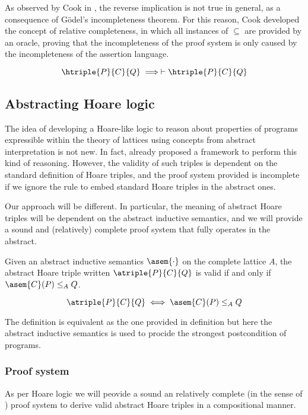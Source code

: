 As observed by Cook in \cite{Cook78}, the reverse implication is not true in 
general, as a consequence of Gödel's incompleteness theorem. For this reason, 
Cook developed the concept of relative completeness, in which all instances of 
$\subseteq$ are provided by an oracle, proving that the incompleteness of the 
proof system is only caused by the incompleteness of the assertion language.

\begin{theorem}
  $$\htriple{P}{C}{Q} \implies \vdash \htriple{P}{C}{Q}$$
\end{theorem}

\subsection{Abstracting Hoare logic}
The idea of developing a Hoare-like logic to reason about properties of 
programs expressible within the theory of lattices using concepts from abstract 
interpretation is not new. In fact, \cite{Cousot12} already proposed a framework 
to perform this kind of reasoning. However, the validity of such triples is 
dependent on the standard definition of Hoare triples, and the proof system 
provided is incomplete if we ignore the rule to embed standard Hoare triples 
in the abstract ones.

Our approach will be different. In particular, the meaning of abstract Hoare 
triples will be dependent on the abstract inductive semantics, and we will 
provide a sound and (relatively) complete proof system that fully operates in 
the abstract.

\begin{definition}
  \label{def:aht}
  Given an abstract inductive semantics $\asem{\cdot}$ on the complete lattice
  $A$, the abstract Hoare triple written $\atriple{P}{C}{Q}$ is valid if
  and only if $\asem{C}(P) \leq_A Q$.

  $$\atriple{P}{C}{Q} \iff \asem{C}(P) \leq_A Q$$
\end{definition}

The definition is equivalent as the one provided in definition \cite{def:hoare} 
but here the abstract inductive semantics is used to procide the strongest 
postcondition of programs.

\subsubsection{Proof system}
As per Hoare logic we will peovide a sound an relatively complete (in the sense
of \cite{Cook78}) proof system to derive valid abstract Hoare triples in a 
compositional manner.

